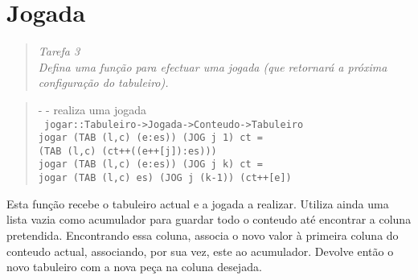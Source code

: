 \documentclass[a4paper,titlepage]{scrreprt}
\begin{document}
\chapter{Jogada}
	\begin{quote}
		\begin{center}
			{\it
			Tarefa 3\\
			Defina uma função para efectuar uma jogada (que retornará a próxima configuração do tabuleiro).
			}
		\end{center}
	\end{quote}
	\begin{quote}
		{\small - - realiza uma jogada\\}
		{\tt
		jogar::Tabuleiro->Jogada->Conteudo->Tabuleiro\\
		jogar (TAB (l,c) (e:es)) (JOG j 1) ct =\\(TAB (l,c) (ct++((e++[j]):es)))\\
		jogar (TAB (l,c) (e:es)) (JOG j k) ct =\\jogar (TAB (l,c) es) (JOG j (k-1)) (ct++[e])
		}
	\end{quote}
	Esta função recebe o tabuleiro actual e a jogada a realizar. Utiliza ainda uma lista vazia como acumulador para guardar todo o
	conteudo até encontrar a coluna pretendida. Encontrando essa coluna, associa o novo valor à primeira coluna do conteudo actual, associando,
	por sua vez, este ao acumulador. Devolve então o novo tabuleiro com a nova peça na coluna desejada.
\end{document}
